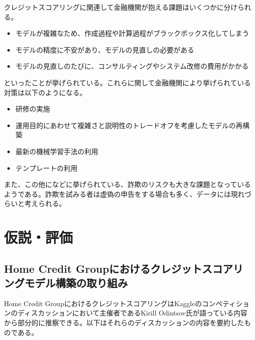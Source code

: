 \documentclass[11pt]{jsarticle}
\providecommand{\tightlist}{%
      \setlength{\itemsep}{0pt}\setlength{\parskip}{0pt}}
\begin{document}
    クレジットスコアリングに関連して金融機関が抱える課題はいくつかに分けられる\cite{fujitsu}。

\begin{itemize}
\tightlist
\item
  モデルが複雑なため、作成過程や計算過程がブラックボックス化してしまう
\item
  モデルの精度に不安があり、モデルの見直しの必要がある
\item
  モデルの見直しのたびに、コンサルティングやシステム改修の費用がかかる
\end{itemize}

といったことが挙げられている。これらに関して金融機関により挙げられている対策は以下のようになる。

\begin{itemize}
\tightlist
\item
  研修の実施
\item
  運用目的にあわせて複雑さと説明性のトレードオフを考慮したモデルの再構築
\item
  最新の機械学習手法の利用
\item
  テンプレートの利用
\end{itemize}

また、この他に\cite{kirill}などに挙げられている、詐欺のリスクも大きな課題となっているようである。詐欺を試みる者は虚偽の申告をする場合も多く、データには現れづらいと考えられる。

    \section{仮説・評価}\label{ux4eeeux8aacux8a55ux4fa1}

\subsection{Home Credit
Groupにおけるクレジットスコアリングモデル構築の取り組み}\label{home-credit-groupux306bux304aux3051ux308bux30afux30ecux30b8ux30c3ux30c8ux30b9ux30b3ux30a2ux30eaux30f3ux30b0ux30e2ux30c7ux30ebux69cbux7bc9ux306eux53d6ux308aux7d44ux307f}

    Home Credit
GroupにおけるクレジットスコアリングはKaggleのコンペティションのディスカッションにおいて主催者であるKirill
Odintsov氏が語っている内容から部分的に推察できる\cite{kirill}。以下はそれらのディスカッションの内容を要約したものである。
\end{document}
